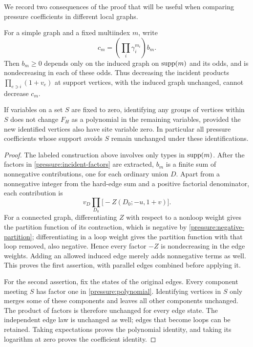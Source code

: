 We record two consequences of the proof that will be useful when
comparing pressure coefficients in different local graphs.

\begin{lemma}
\label{pressure:coefficient-locality}
For a simple graph and a fixed multiindex $m$, write
\begin{equation}
 c_m=\left(\prod_i\gamma_i^{m_i}\right)b_m.
 \label{pressure:incident-factors}
\end{equation}
Then $b_m\ge0$ depends only on the induced graph on $\operatorname{supp}(m)$ and
its odds, and is nondecreasing in each of these odds. Thus decreasing
the incident products $\prod_{e\ni i}(1+v_e)$ at support vertices,
with the induced graph unchanged, cannot decrease $c_m$.

If variables on a set $S$ are fixed to zero, identifying any groups
of vertices within $S$ does not change $F_H$ as a polynomial in the
remaining variables, provided the new identified vertices also have
site variable zero. In particular all pressure coefficients whose
support avoids $S$ remain unchanged under these identifications.
\end{lemma}

\begin{proof}
The labeled construction above involves only types in $\operatorname{supp}(m)$.
After the factors in \eqref{pressure:incident-factors} are extracted,
$b_m$ is a finite sum of nonnegative contributions, one for each
ordinary union $D$. Apart from a nonnegative integer from the
hard-edge sum and a positive factorial denominator, each contribution
is
\[
 v_D\prod_{D_0}\bigl[-Z(D_0;-u,1+v)\bigr].
\]
For a connected graph, differentiating $Z$ with respect to a nonloop
weight gives the partition function of its contraction, which is
negative by \eqref{pressure:negative-partition}; differentiating in
a loop weight gives the partition function with that loop removed,
also negative. Hence every factor $-Z$ is nondecreasing in the edge
weights. Adding an allowed induced edge merely adds nonnegative
terms as well. This proves the first assertion, with parallel edges
combined before applying it.

For the second assertion, fix the states of the original edges.
Every component meeting $S$ has factor one in
\eqref{pressure:polynomial}. Identifying vertices in $S$ only merges
some of these components and leaves all other components unchanged.
The product of factors is therefore unchanged for every edge state.
The independent edge law is unchanged as well; edges that become
loops can be retained. Taking expectations proves the polynomial
identity, and taking its logarithm at zero proves the coefficient
identity.
\end{proof}

